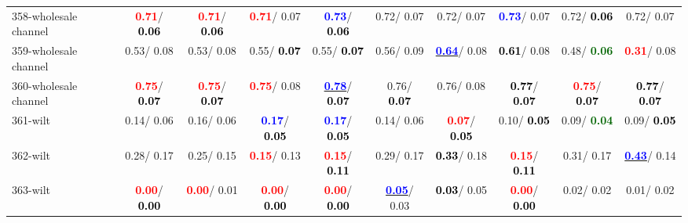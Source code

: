 \begin{table}[h]
\begin{center}
{\begin{tabular}{lc|c|c|c|c|c|c|c|c}
358-wholesale channel & \textcolor{red}{\textbf{  0.71}}/\textcolor{black}{\textbf{  0.06}} & \textcolor{red}{\textbf{  0.71}}/\textcolor{black}{\textbf{  0.06}} & \textcolor{red}{\textbf{  0.71}}/  0.07 & \textcolor{blue}{\textbf{  0.73}}/\textcolor{black}{\textbf{  0.06}} &   0.72/  0.07 &   0.72/  0.07 & \textcolor{blue}{\textbf{  0.73}}/  0.07 &   0.72/\textcolor{black}{\textbf{  0.06}} &   0.72/  0.07 \\
359-wholesale channel &   0.53/  0.08 &   0.53/  0.08 &   0.55/\textcolor{black}{\textbf{  0.07}} &   0.55/\textcolor{black}{\textbf{  0.07}} &   0.56/  0.09 & \underline{\textcolor{blue}{\textbf{  0.64}}}/  0.08 & \textcolor{black}{\textbf{  0.61}}/  0.08 &   0.48/\textcolor{darkgreen}{\textbf{  0.06}} & \textcolor{red}{\textbf{  0.31}}/  0.08 \\ \hline
360-wholesale channel & \textcolor{red}{\textbf{  0.75}}/\textcolor{black}{\textbf{  0.07}} & \textcolor{red}{\textbf{  0.75}}/\textcolor{black}{\textbf{  0.07}} & \textcolor{red}{\textbf{  0.75}}/  0.08 & \underline{\textcolor{blue}{\textbf{  0.78}}}/\textcolor{black}{\textbf{  0.07}} &   0.76/\textcolor{black}{\textbf{  0.07}} &   0.76/  0.08 & \textcolor{black}{\textbf{  0.77}}/\textcolor{black}{\textbf{  0.07}} & \textcolor{red}{\textbf{  0.75}}/\textcolor{black}{\textbf{  0.07}} & \textcolor{black}{\textbf{  0.77}}/\textcolor{black}{\textbf{  0.07}} \\
361-wilt &   0.14/  0.06 &   0.16/  0.06 & \textcolor{blue}{\textbf{  0.17}}/\textcolor{black}{\textbf{  0.05}} & \textcolor{blue}{\textbf{  0.17}}/\textcolor{black}{\textbf{  0.05}} &   0.14/  0.06 & \textcolor{red}{\textbf{  0.07}}/\textcolor{black}{\textbf{  0.05}} &   0.10/\textcolor{black}{\textbf{  0.05}} &   0.09/\textcolor{darkgreen}{\textbf{  0.04}} &   0.09/\textcolor{black}{\textbf{  0.05}} \\
362-wilt &   0.28/  0.17 &   0.25/  0.15 & \textcolor{red}{\textbf{  0.15}}/  0.13 & \textcolor{red}{\textbf{  0.15}}/\textcolor{black}{\textbf{  0.11}} &   0.29/  0.17 & \textcolor{black}{\textbf{  0.33}}/  0.18 & \textcolor{red}{\textbf{  0.15}}/\textcolor{black}{\textbf{  0.11}} &   0.31/  0.17 & \underline{\textcolor{blue}{\textbf{  0.43}}}/  0.14 \\
363-wilt & \textcolor{red}{\textbf{  0.00}}/\textcolor{black}{\textbf{  0.00}} & \textcolor{red}{\textbf{  0.00}}/  0.01 & \textcolor{red}{\textbf{  0.00}}/\textcolor{black}{\textbf{  0.00}} & \textcolor{red}{\textbf{  0.00}}/\textcolor{black}{\textbf{  0.00}} & \underline{\textcolor{blue}{\textbf{  0.05}}}/  0.03 & \textcolor{black}{\textbf{  0.03}}/  0.05 & \textcolor{red}{\textbf{  0.00}}/\textcolor{black}{\textbf{  0.00}} &   0.02/  0.02 &   0.01/  0.02 \\

\end{tabular}}
\end{center}
\end{table}
